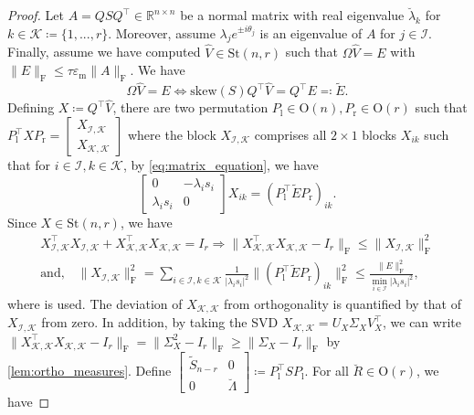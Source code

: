\documentclass[10pt,twoside,dvipsnames]{siamart1116}
\numberwithin{algorithm}{section}
\numberwithin{equation}{section}
\begin{document}
\begin{proof}
 Let $A=QSQ^\top \in\mathbb{R}^{n\times n}$ be a normal matrix with real eigenvalue $\breve{\lambda}_k$ for $k\in\mathcal{K}\coloneq\{1,...,r\}$. Moreover, assume $\lambda_j e^{\pm i\theta_j}$ is an eigenvalue of $A$ for $j \in\mathcal{I}$. Finally, assume we have computed $\widehat{V}\in\mathrm{St}(n,r)$ such that $\Omega\widehat{V}=E$ with $\|E\|_\mathrm{F}\leq\tau \varepsilon_\mathrm{m} \|A\|_\mathrm{F}$. We have
\begin{equation}\label{eq:matrix_equation}
	\Omega\widehat{V}=E\iff \mathrm{skew}(S)Q^\top \widehat{V} =Q^\top E\eqcolon\widetilde{E}.
\end{equation}
Defining $X\coloneq Q^\top\widehat{V}$, there are two permutation $P_\mathrm{l}\in\mathrm{O}(n),P_\mathrm{r}\in\mathrm{O}(r) $ such that $P_\mathrm{l}^\top X P_\mathrm{r}=\left[\begin{smallmatrix}X_{\mathcal{I},\mathcal{K}}  \\X_{\mathcal{K},\mathcal{K}}\end{smallmatrix}\right]$ where the block $X_{\mathcal{I},\mathcal{K}}$ comprises all $2\times 1$ blocks $X_{ik}$ such that for $i\in\mathcal{I}, k\in\mathcal{K}$, by \eqref{eq:matrix_equation}, we have
\begin{equation*}
\begin{bmatrix}
		0&-\lambda_i s_i\\
		\lambda_i s_i&0
	\end{bmatrix}X_{ik}=(P_\mathrm{l}^\top \widetilde{E} P_\mathrm{r})_{ik}.
\end{equation*} 
Since $X\in\mathrm{St}(n,r)$, we have
\begin{align*}
 X_{\mathcal{I},\mathcal{K}}^\top X_{\mathcal{I},\mathcal{K}} +X_{\mathcal{K},\mathcal{K}}^\top X_{\mathcal{K},\mathcal{K}} = I_{r} \Longrightarrow \| X_{\mathcal{K},\mathcal{K}}^\top X_{\mathcal{K},\mathcal{K}}-I_{r}\|_\mathrm{F}\leq \| X_{\mathcal{I},\mathcal{K}}\|_\mathrm{F}^2\\
 \text{and,}\quad \| X_{\mathcal{I},\mathcal{K}}\|_\mathrm{F}^2= \sum_{i\in\mathcal{I}, k\in\mathcal{K}} \frac{1}{|\lambda_i s_i|^2}\|(P_\mathrm{l}^\top \widetilde{E}  P_\mathrm{r})_{ik}\|_\mathrm{F}^2\leq \frac{\|E\|_\mathrm{F}^2}{\min_{i\in\mathcal{I}}|\lambda_i s_i|^2},
\end{align*}
where \cite[Thm.~VII.2.8]{bhatia97} is used. The deviation of $X_{\mathcal{K},\mathcal{K}}$ from orthogonality is quantified by that of $X_{\mathcal{I},\mathcal{K}}$ from zero. In addition, by taking the SVD $ X_{\mathcal{K},\mathcal{K}}=U_X\Sigma_X V_X^\top$, we can write $\| X_{\mathcal{K},\mathcal{K}}^\top X_{\mathcal{K},\mathcal{K}}-I_{r}\|_\mathrm{F}=\|\Sigma_X^2-I_{r}\|_\mathrm{F}\geq \|\Sigma_X-I_{r}\|_\mathrm{F}$ by \cref{lem:ortho_measures}. Define $\left[\begin{smallmatrix}\widetilde{S}_{n-r} &0 \\ 0 &\breve{\Lambda}\end{smallmatrix}\right]\coloneq P_\mathrm{l}^\top S P_\mathrm{l}$. For all $\breve{R}\in \mathrm{O}(r)$, we have 

\end{proof}
\end{document}
